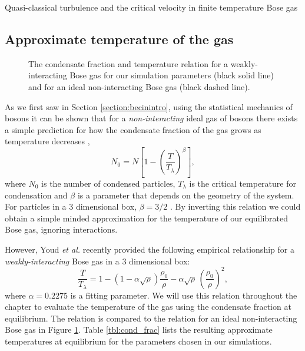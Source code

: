 \begin{chapter}{\label{cha:nonequib}Quasi-classical turbulence and the critical velocity in finite temperature Bose gas}
\subsection{Approximate temperature of the gas}
\begin{figure}
\begin{center}
%
\end{center}
\caption{\label{fig:cfvst}The condensate fraction and temperature relation for a weakly-interacting Bose gas for our simulation parameters (black solid line) and for an ideal non-interacting Bose gas (black dashed line).}
\end{figure} 

As we first saw in Section \ref{section:becinintro}, using the statistical mechanics of bosons it can be shown that for a {\it non-interacting} ideal gas of bosons there exists a simple prediction for how the condensate fraction of the gas grows as temperature decreases \cite{Pethick},
\begin{equation}
N_0 = N \left [ 1-\left ( \frac{T}{T_\lambda} \right )^\beta \right ],
\end{equation}
where $N_0$ is the number of condensed particles, $T_{\lambda}$ is the critical temperature for condensation and $\beta$ is a parameter that depends on the geometry of the system. For particles in a 3 dimensional box, $\beta=3/2$ \cite{Pethick}. By inverting this relation we could obtain a simple minded approximation for the temperature of our equilibrated Bose gas, ignoring interactions.

However, Youd {\it et al.} \cite{berloff_2007} recently provided the following empirical relationship for a {\it weakly-interacting} Bose gas in a 3 dimensional box:
\begin{equation}
  \frac{T}{T_\lambda} = 1 - (1 - \alpha\sqrt{\rho})\frac{\rho_0}{\rho} - \alpha\sqrt{\rho}\,\left(\frac{\rho_0}{\rho}\right)^2,
  \label{eq:temp}
\end{equation}
where $\alpha=0.2275$ is a fitting parameter. We will use this relation throughout the chapter to evaluate the temperature of the gas using the condensate fraction at equilibrium. The relation is compared to the relation for an ideal non-interacting Bose gas in Figure \ref{fig:cfvst}. Table \ref{tbl:cond_frac} lists the resulting approximate temperatures at equilibrium for the parameters chosen in our simulations.


\end{chapter}
